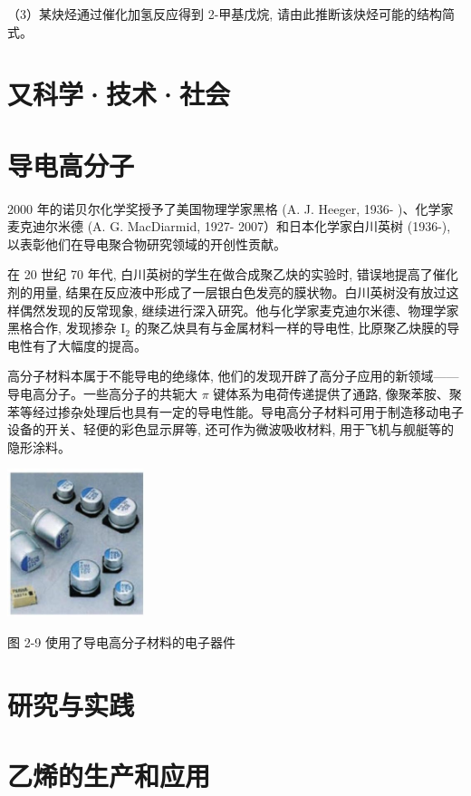 \documentclass[10pt]{article}
\begin{document}
（3）某炔烃通过催化加氢反应得到 2-甲基戊烷, 请由此推断该炔烃可能的结构简式。

\section*{又科学·技术·社会}

\section*{导电高分子}

2000 年的诺贝尔化学奖授予了美国物理学家黑格 (A. J. Heeger, 1936- )、化学家麦克迪尔米德 (A. G. MacDiarmid, 1927- 2007）和日本化学家白川英树 (1936-), 以表彰他们在导电聚合物研究领域的开创性贡献。

在 20 世纪 70 年代, 白川英树的学生在做合成聚乙炔的实验时, 错误地提高了催化剂的用量, 结果在反应液中形成了一层银白色发亮的膜状物。白川英树没有放过这样偶然发现的反常现象, 继续进行深入研究。他与化学家麦克迪尔米德、物理学家黑格合作, 发现掺杂 \({\mathrm{I}}_{2}\) 的聚乙炔具有与金属材料一样的导电性, 比原聚乙炔膜的导电性有了大幅度的提高。

高分子材料本属于不能导电的绝缘体, 他们的发现开辟了高分子应用的新领域—— 导电高分子。一些高分子的共轭大 \(\pi\) 键体系为电荷传递提供了通路, 像聚苯胺、聚苯等经过掺杂处理后也具有一定的导电性能。导电高分子材料可用于制造移动电子设备的开关、轻便的彩色显示屏等, 还可作为微波吸收材料, 用于飞机与舰艇等的隐形涂料。

\begin{center}
\includegraphics[max width=0.3\textwidth]{images/0190efc5-b58a-7c43-bfb0-e0a030df9cfd_45_869853.jpg}
\end{center}

图 2-9 使用了导电高分子材料的电子器件

\section*{研究与实践}

\section*{乙烯的生产和应用}
\end{document}
